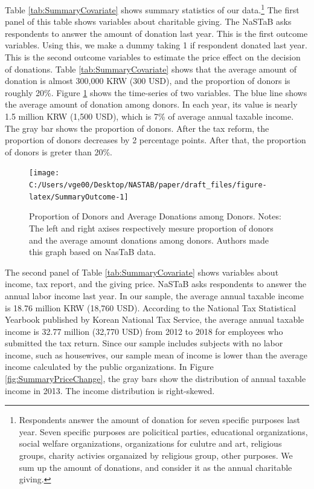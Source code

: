 \documentclass[
  11pt,
  a4paper,
]{article}
\begin{document}
Table \ref{tab:SummaryCovariate} shows summary statistics of our data.\footnote{Respondents answer the amount of donation for seven specific purposes last year. Seven specific purposes are policitical parties, educational organizations, social welfare organizations, organizations for culutre and art, religious groups, charity activies organaized by religious group, other purposes. We sum up the amount of donations, and consider it as the annual charitable giving.}
The first panel of this table shows variables about charitable giving.
The NaSTaB asks respondents to answer the amount of donation last year.
This is the first outcome variables.
Using this, we make a dummy taking 1 if respondent donated last year.
This is the second outcome variables to estimate the price effect on the decision of donations.
Table \ref{tab:SummaryCovariate} shows that
the average amount of donation is almost 300,000 KRW (300 USD),
and the proportion of donors is roughly 20\%.
Figure \ref{fig:SummaryOutcome} shows the time-series of two variables.
The blue line shows the average amount of donation among donors.
In each year, its value is nearly 1.5 million KRW (1,500 USD),
which is 7\% of average annual taxable income.
The gray bar shows the proportion of donors.
After the tax reform, the proportion of donors decreases by 2 percentage points.
After that, the proportion of donors is greter than 20\%.

\begin{figure}[t]

{\centering \texttt{[image: C:/Users/vge00/Desktop/NASTAB/paper/draft\_files/figure-latex/SummaryOutcome-1]} 

}

\caption{Proportion of Donors and Average Donations among Donors. Notes: The left and right axises respectively mesure proportion of donors and the average amount donations among donors. Authors made this graph based on NasTaB data.}\label{fig:SummaryOutcome}
\end{figure}

The second panel of Table \ref{tab:SummaryCovariate} shows variables about income, tax report, and the giving price.
NaSTaB asks respondents to answer the annual labor income last year.
In our sample, the average annual taxable income is 18.76 million KRW (18,760 USD).
According to the National Tax Statistical Yearbook published by Korean National Tax Service,
the average annual taxable income is 32.77 million (32,770 USD) from 2012 to 2018
for employees who submitted the tax return.
Since our sample includes subjects with no labor income, such as housewives,
our sample mean of income is lower than the average income calculated by the public organizations.
In Figure \ref{fig:SummaryPriceChange},
the gray bars show the distribution of annual taxable income in 2013.
The income distribution is right-skewed.
\end{document}
